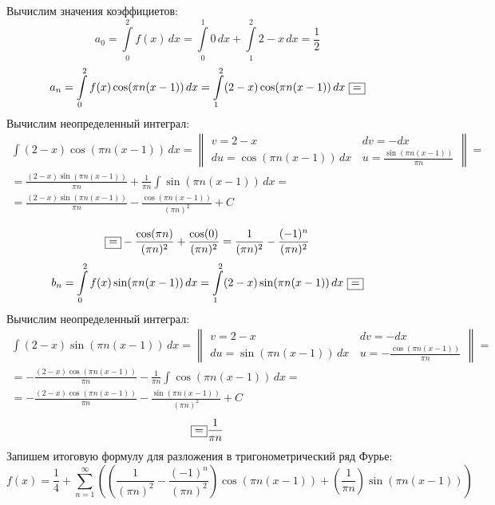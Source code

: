 \documentclass[a5paper, 10pt]{article}
\theoremstyle{definition}
\theoremstyle{plain}
\theoremstyle{remark}
\begin{document}
Вычислим значения коэффициетов:
\begin{equation*}
a_0 = \int \limits_{0}^{2} f(x) \, dx = \int \limits_{0}^{1} 0 \, dx + \int \limits_{1}^{2} 2 - x \, dx = \frac{1}{2}
\end{equation*}
\begin{multline*}
a_n  = \int \limits_{0}^{2} f(x) \cos(\pi n(x-1)) \, dx = \int \limits_{1}^{2} (2-x) \cos(\pi n(x-1)) \, dx \, \, \fbox{=}
\end{multline*}
Вычислим неопределенный интеграл:
\begin{multline*}
 \int  (2-x) \cos(\pi n(x-1)) \, dx = 
\begin{Vmatrix}
v = 2-x \, & dv = -dx\\
du = \cos(\pi n(x-1)) \, dx \, & u = \frac{\sin(\pi n(x-1))}{\pi n}
\end{Vmatrix}
= \\ =  \frac{(2-x) \sin(\pi n(x-1))}{\pi n} + \frac{1}{\pi n} \int \sin(\pi n(x-1)) \, dx = \\=
 \frac{(2-x) \sin(\pi n(x-1))}{\pi n} -  \frac{\cos (\pi n(x-1))}{(\pi n)^2} + C
\end{multline*}

\begin{equation*}
\fbox{=} -  \frac{\cos (\pi n)}{(\pi n)^2} + \frac{\cos (0)}{(\pi n)^2} = \frac{1}{(\pi n)^2} -  \frac{(-1)^n}{(\pi n)^2}
\end{equation*}
\begin{equation*}
b_n  = \int \limits_{0}^{2} f(x) \sin(\pi n(x-1)) \, dx  =  \int \limits_{1}^{2} (2-x) \sin(\pi n(x-1)) \, dx \, \, \fbox{=}
\end{equation*}
Вычислим неопределенный интеграл:
\begin{multline*}
 \int  (2-x) \sin(\pi n(x-1)) \, dx = 
\begin{Vmatrix}
v = 2-x \, & dv = -dx\\
du = \sin(\pi n(x-1)) \, dx \, & u = -\frac{\cos(\pi n(x-1))}{\pi n}
\end{Vmatrix}
= \\ =  - \frac{(2-x) \cos(\pi n(x-1))}{\pi n} - \frac{1}{\pi n} \int \cos(\pi n(x-1)) \, dx = \\=
 -\frac{(2-x) \cos(\pi n(x-1))}{\pi n} -  \frac{\sin (\pi n(x-1))}{(\pi n)^2} + C
\end{multline*}
\begin{equation*}
\fbox{=} \frac{1}{\pi n}
\end{equation*}
Запишем итоговую формулу для разложения в тригонометрический ряд Фурье:
\begin{equation*}
f (x) = \frac{1}{4} + \sum \limits_{n = 1}^{\infty} \left( \left( \frac{1}{(\pi n)^2} -  \frac{(-1)^n}{(\pi n)^2}  \right) \cos(\pi n(x-1)) +  \left( \frac{1}{\pi n} \right) \sin(\pi n(x-1)) \right)
\end{equation*}
\end{document}
